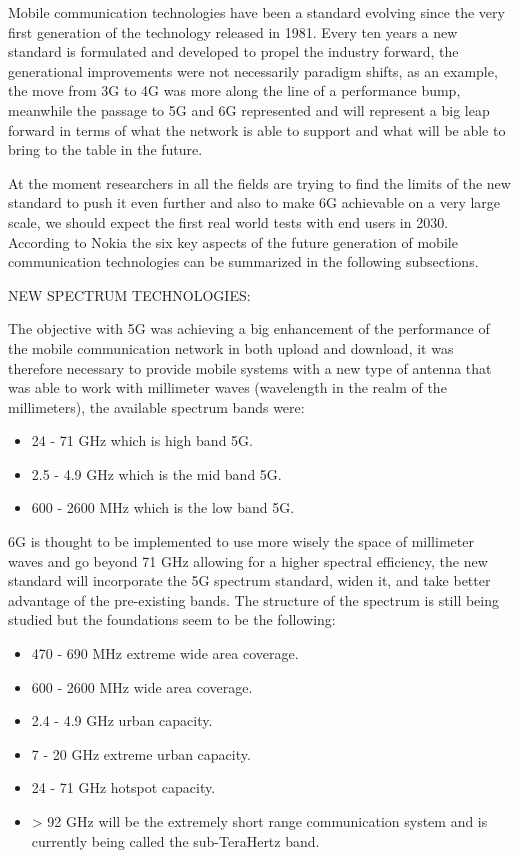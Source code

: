 

Mobile communication technologies have been a standard evolving since the very first
generation of the technology released in 1981. Every ten years a new standard is formulated and
developed to propel the industry forward, the generational improvements were not necessarily
paradigm shifts, as an example, the move from 3G to 4G was more along the line of a performance bump,
meanwhile the passage to 5G and 6G represented and will represent a big leap forward in terms of
what the network is able to support and what will be able to bring to the table in the future.

At the moment researchers in all the fields are trying to find the limits of the new standard to
push it even further and also to make 6G achievable on a very large scale, we should expect the
first real world tests with end users in 2030. According to Nokia\cite{nokiabell} the six key aspects of the future generation of mobile communication technologies can be summarized in the following subsections.

\bigskip
\noindent
NEW SPECTRUM TECHNOLOGIES:
\label{ssec:spectrum-technologies}

The objective with 5G was achieving a big enhancement of the performance of the mobile communication
network in both upload and download, it was therefore necessary to provide mobile systems with a new
type of antenna that was able to work with millimeter waves (wavelength in the realm of the
millimeters), the available spectrum bands were:
\begin{itemize}
	\item 24 - 71 GHz which is high band 5G.
	\item 2.5 - 4.9 GHz which is the mid band 5G.
	\item 600 - 2600 MHz which is the low band 5G.
\end{itemize}
6G is thought to be implemented to use more wisely the space of millimeter waves and go beyond 71
GHz allowing for a higher spectral efficiency, the new standard will incorporate the 5G spectrum
standard, widen it, and take better advantage of the pre-existing bands. The structure of the spectrum is still being studied but the foundations seem to be the following:
\begin{itemize}
	\item 470 - 690 MHz extreme wide area coverage.
	\item 600 - 2600 MHz wide area coverage.
	\item 2.4 - 4.9 GHz urban capacity.
	\item 7 - 20 GHz extreme urban capacity.
	\item 24 - 71 GHz hotspot capacity.
	\item > 92 GHz will be the extremely short range communication system and is currently being
	called the sub-TeraHertz band.
\end{itemize}

